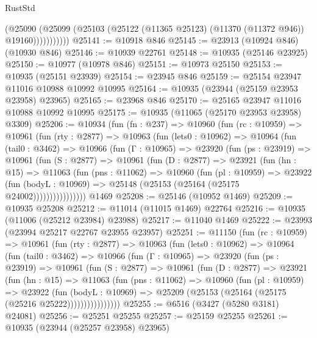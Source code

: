 \begin{lexlean}{RustStd}
\begin{coremodule}
{\begin{coremodule}
{{{{{{{{{{{{{{{{{{{{{{{{{{{{{{{{{{{{{{{{{{{{{{{{{{{{{{{{{{{{{{{{{{{{{{{{{{{{{{{{{{{{{                  (@25090
                    (@25099 (@25103 (@25122 (@11365 @25123) (@11370 (@11372 @946)) @19160)))))))))))
@25141 := @10918 @846
@25145 := @23913 (@10924 @846) (@10930 @846)
@25146 := @10939 @22761
@25148 := @10935 (@25146 @23925)
@25150 := @10977 (@10978 @846)
@25151 := @10973 @25150
@25153 := @10935 (@25151 @23939)
@25154 := @23945 @846
@25159 := @25154 @23947 @11016 @10988 @10992 @10995
@25164 := @10935 (@23944 (@25159 @23953 @23958) @23965)
@25165 := @23968 @846
@25170 := @25165 @23947 @11016 @10988 @10992 @10995
@25175 := @10935 (@11065 (@25170 @23953 @23958) @3309)
@25206 := @10934
    (fun (fn : @237) =>
    @10960
      (fun (rc : @10959) =>
      @10961
        (fun (rty : @2877) =>
        @10963
          (fun (lets0 : @10962) =>
          @10964
            (fun (tail0 : @3462) =>
            @10966
              (fun (Γ : @10965) =>
              @23920
                (fun (ps : @23919) =>
                @10961
                  (fun (S : @2877) =>
                  @10961
                    (fun (D : @2877) =>
                    @23921
                      (fun (hn : @15) =>
                      @11063
                        (fun (pns : @11062) =>
                        @10960
                          (fun (pl : @10959) =>
                          @23922
                            (fun (bodyL : @10969) =>
                            @25148 (@25153 (@25164 (@25175 @24002))))))))))))))))
    @1469
@25208 := @25146 (@10952 @1469)
@25209 := @10935 @25208
@25212 := @11014 (@11015 @1469) @22764
@25216 := @10935 (@11006 (@25212 @23984) @23988)
@25217 := @11040 @1469
@25222 := @23993 (@23994 @25217 @22767 @23955 @23957)
@25251 := @11150
    (fun (rc : @10959) =>
    @10961
      (fun (rty : @2877) =>
      @10963
        (fun (lets0 : @10962) =>
        @10964
          (fun (tail0 : @3462) =>
          @10966
            (fun (Γ : @10965) =>
            @23920
              (fun (ps : @23919) =>
              @10961
                (fun (S : @2877) =>
                @10961
                  (fun (D : @2877) =>
                  @23921
                    (fun (hn : @15) =>
                    @11063
                      (fun (pns : @11062) =>
                      @10960
                        (fun (pl : @10959) =>
                        @23922
                          (fun (bodyL : @10969) =>
                          @25209 (@25153 (@25164 (@25175 (@25216 @25222))))))))))))))))
@25255 := @6516 (@3427 (@5280 @3181) @24081)
@25256 := @25251 @25255
@25257 := @25159 @25255
@25261 := @10935 (@23944 (@25257 @23958) @23965)
}}}}}}}}}}}}}}}}}}}}}}}}}}}}}}}}}}}}}}}}}}}}}}}}}}}}}}}}}}}}}}}}}}}}}}}}}}}}}}}}}}}}}
\end{coremodule}}
\end{coremodule}
\end{lexlean}
